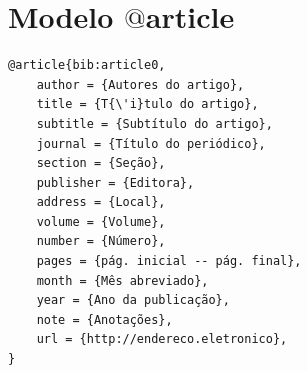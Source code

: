 \documentclass[a4paper,12pt,oneside,onecolumn,final,fleqn]{repUERJ}
\begin{document}

\backmatter %







\appendix %


\section{Modelo $@$article} \label{sec:modelos}

\noindent{}

\begin{verbatim}
@article{bib:article0,
    author = {Autores do artigo},
    title = {T{\'i}tulo do artigo},
    subtitle = {Subtítulo do artigo},
    journal = {Título do periódico},
    section = {Seção},
    publisher = {Editora},
    address = {Local},
    volume = {Volume},
    number = {Número},
    pages = {pág. inicial -- pág. final},
    month = {Mês abreviado},
    year = {Ano da publicação},
    note = {Anotações},
    url = {http://endereco.eletronico},
}
\end{verbatim}
\end{document}

